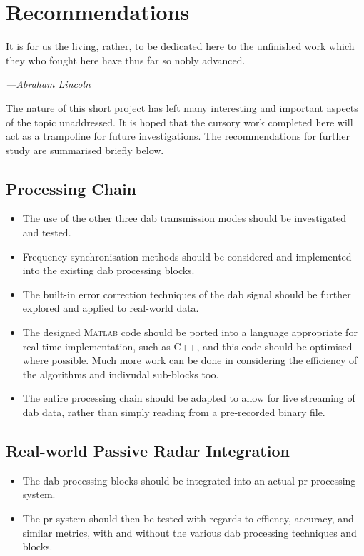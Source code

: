 \documentclass[class=report,11pt,crop=false]{standalone}
\begin{document}
\chapter{Recommendations \label{ch:recommendations}}
\epigraph{It is for us the living, rather, to be dedicated here to the unfinished work which they who fought here have thus far so nobly advanced.}%
    {\emph{---Abraham Lincoln}}

The nature of this short project has left many interesting and important aspects of the topic unaddressed. It is hoped that the cursory work completed here will act as a trampoline for future investigations. The recommendations for further study are summarised briefly below.

\section{ Processing Chain}
\begin{itemize}
    \item The use of the other three \gls{dab} transmission modes should be investigated and tested.
    \item Frequency synchronisation methods should be considered and implemented into the existing \gls{dab} processing blocks.
    \item The built-in error correction techniques of the \gls{dab} signal should be further explored and applied to real-world data.
    \item The designed \textsc{Matlab} code should be ported into a language appropriate for real-time implementation, such as \textsc{C++}, and this code should be optimised where possible. Much more work can be done in considering the efficiency of the algorithms and indivudal sub-blocks too.
    \item The entire processing chain should be adapted to allow for live streaming of \gls{dab} data, rather than simply reading from a pre-recorded binary file.
\end{itemize}

\section{Real-world Passive Radar Integration}
\begin{itemize}
    \item The \gls{dab} processing blocks should be integrated into an actual \gls{pr} processing system.
    \item The \gls{pr} system should then be tested with regards to effiency, accuracy, and similar metrics, with and without the various \gls{dab} processing techniques and blocks.
\end{itemize}





\ifstandalone

\printnoidxglossary[type=\acronymtype,nonumberlist]
\fi
\end{document}
